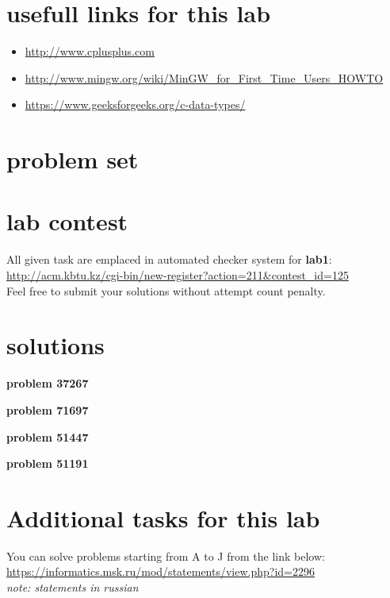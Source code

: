 \documentclass[12pt]{article}%
\begin{document}
    \section{usefull links for this lab}
    \begin{itemize}
        \item \url{http://www.cplusplus.com}
        \item \url{http://www.mingw.org/wiki/MinGW_for_First_Time_Users_HOWTO}
        \item \url{https://www.geeksforgeeks.org/c-data-types/}
    \end{itemize}
    
    \section{problem set}
    
    
    
    

    \section{lab contest}
    
    All given task are emplaced in automated checker system for \textbf{lab1}: \url{http://acm.kbtu.kz/cgi-bin/new-register?action=211&contest_id=125}\\
    Feel free to submit your solutions without attempt count penalty.

    \section{solutions}
    \textbf{problem 37267}
    
    \textbf{problem 71697}
    
    \textbf{problem 51447}
    
    \textbf{problem 51191}
    

    \section{Additional tasks for this lab}
    You can solve problems starting from A to J from the link below:\\
    \url{https://informatics.msk.ru/mod/statements/view.php?id=2296}\\
    \textit{note: statements in russian}
\end{document}
